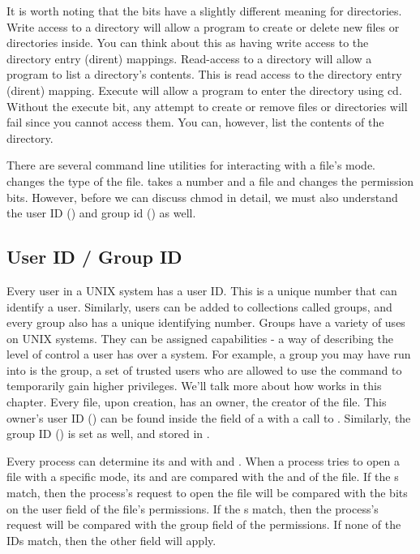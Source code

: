 It is worth noting that the  bits have a slightly different meaning for directories.
Write access to a directory will allow a program to create or delete new files or directories inside.
You can think about this as having write access to the directory entry (dirent) mappings.
Read-access to a directory will allow a program to list a directory's contents.
This is read access to the directory entry (dirent) mapping.
Execute will allow a program to enter the directory using cd.
Without the execute bit, any attempt to create or remove files or directories will fail since you cannot access them.
You can, however, list the contents of the directory.

There are several command line utilities for interacting with a file's mode.
 changes the type of the file.
 takes a number and a file and changes the permission bits.
However, before we can discuss chmod in detail, we must also understand the user ID () and group id () as well.

\subsection{User ID / Group ID}

Every user in a UNIX system has a user ID.
This is a unique number that can identify a user.
Similarly, users can be added to collections called groups, and every group also has a unique identifying number.
Groups have a variety of uses on UNIX systems.
They can be assigned capabilities - a way of describing the level of control a user has over a system.
For example, a group you may have run into is the  group, a set of trusted users who are allowed to use the command  to temporarily gain higher privileges.
We'll talk more about how  works in this chapter.
Every file, upon creation, has an owner, the creator of the file.
This owner's user ID () can be found inside the  field of a  with a call to .
Similarly, the group ID () is set as well, and stored in .

Every process can determine its  and  with  and .
When a process tries to open a file with a specific mode, its  and  are compared with the  and  of the file.
If the s match, then the process's request to open the file will be compared with the bits on the user field of the file's permissions.
If the s match, then the process's request will be compared with the group field of the permissions.
If none of the IDs match, then the other field will apply.

